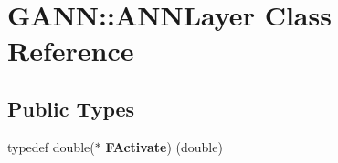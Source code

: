 \hypertarget{class_g_a_n_n_1_1_a_n_n_layer}{}\section{G\+A\+N\+N\+:\+:A\+N\+N\+Layer Class Reference}
\label{class_g_a_n_n_1_1_a_n_n_layer}
\subsection*{Public Types}
\begin{DoxyCompactItemize}
\item 
\hypertarget{class_g_a_n_n_1_1_a_n_n_layer_abb160533dd36e791bd0e561ef244cbae}{}typedef double($\ast$ {\bfseries F\+Activate}) (double)\label{class_g_a_n_n_1_1_a_n_n_layer_abb160533dd36e791bd0e561ef244cbae}

\end{DoxyCompactItemize}
